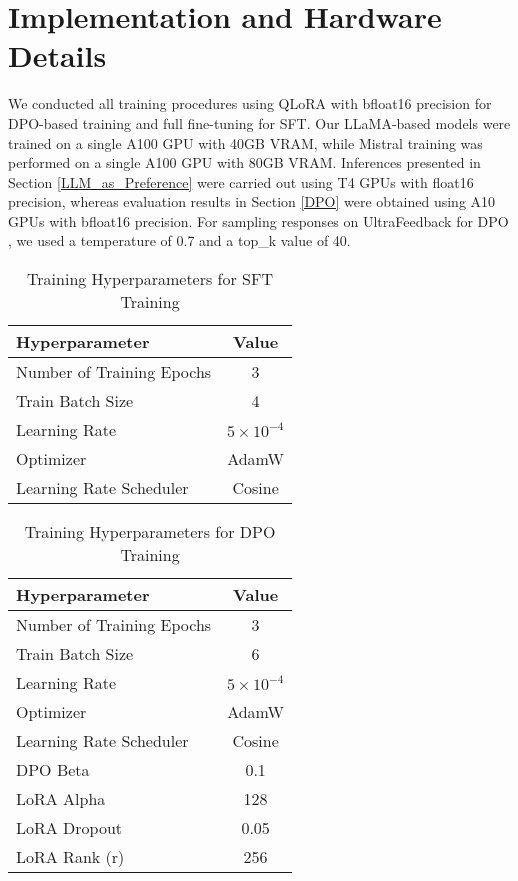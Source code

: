\section{Implementation and Hardware Details}


\label{Training}
We conducted all training procedures using QLoRA with bfloat16 precision for DPO-based training and full fine-tuning for SFT. Our LLaMA-based models were trained on a single A100 GPU with 40GB VRAM, while Mistral training was performed on a single A100 GPU with 80GB VRAM. Inferences presented in Section \ref{LLM_as_Preference} were carried out using T4 GPUs with float16 precision, whereas evaluation results in Section \ref{DPO} were obtained using A10 GPUs with bfloat16 precision.
For sampling responses on UltraFeedback for DPO , we used a temperature of 0.7 and a top\_k value of 40.

\begin{table}[H]
    \centering
    \begin{tabular}{l|c}
        \toprule
        \textbf{Hyperparameter} & \textbf{Value} \\
        \midrule
        Number of Training Epochs & 3 \\
        Train Batch Size & 4 \\
        Learning Rate & $5 \times 10^{-4}$ \\
        Optimizer & AdamW \\
        Learning Rate Scheduler & Cosine \\
        \bottomrule
    \end{tabular}
    \caption{Training Hyperparameters for SFT Training}
    \label{hyperparameters_sft}
\end{table}

\begin{table}[H]
    \centering
    \begin{tabular}{l|c}
        \toprule
        \textbf{Hyperparameter} & \textbf{Value} \\
        \midrule
        Number of Training Epochs & 3 \\
        Train Batch Size & 6 \\
        Learning Rate &  $5 \times 10^{-4}$\\
        Optimizer & AdamW \\
        Learning Rate Scheduler & Cosine \\
        DPO Beta & 0.1 \\
        LoRA Alpha & 128 \\
        LoRA Dropout & 0.05 \\
        LoRA Rank (r) & 256 \\
        
        \bottomrule
    \end{tabular}
    \caption{Training Hyperparameters for DPO Training}
    \label{hyperparameters_dpo}
\end{table}
